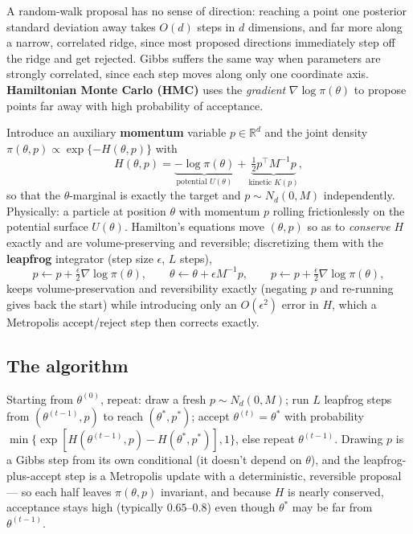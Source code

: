\documentclass[
  letterpaper,
  DIV=11,
  numbers=noendperiod]{scrreprt}
\begin{document}
A random-walk proposal has no sense of direction: reaching a point one
posterior standard deviation away takes \(O(d)\) steps in \(d\)
dimensions, and far more along a narrow, correlated ridge, since most
proposed directions immediately step off the ridge and get rejected.
Gibbs suffers the same way when parameters are strongly correlated,
since each step moves along only one coordinate axis.
\textbf{Hamiltonian Monte Carlo (HMC)} uses the \emph{gradient}
\(\nabla \log \pi(\theta)\) to propose points far away with high
probability of acceptance.

Introduce an auxiliary \textbf{momentum} variable \(p \in \mathbb R^d\)
and the joint density \(\pi(\theta, p) \propto \exp\{-H(\theta,p)\}\)
with \[
H(\theta, p) = \underbrace{-\log \pi(\theta)}_{\text{potential } U(\theta)} + \underbrace{\tfrac12 p^\top M^{-1} p}_{\text{kinetic } K(p)},
\] so that the \(\theta\)-marginal is exactly the target and
\(p \sim N_d(0, M)\) independently. Physically: a particle at position
\(\theta\) with momentum \(p\) rolling frictionlessly on the potential
surface \(U(\theta)\). Hamilton's equations move \((\theta,p)\) so as to
\emph{conserve} \(H\) exactly and are volume-preserving and reversible;
discretizing them with the \textbf{leapfrog} integrator (step size
\(\epsilon\), \(L\) steps), \[
p \leftarrow p + \tfrac\epsilon2 \nabla\log\pi(\theta), \qquad \theta \leftarrow \theta + \epsilon M^{-1}p, \qquad p \leftarrow p + \tfrac\epsilon2\nabla\log\pi(\theta),
\] keeps volume-preservation and reversibility exactly (negating \(p\)
and re-running gives back the start) while introducing only an
\(O(\epsilon^2)\) error in \(H\), which a Metropolis accept/reject step
then corrects exactly.

\subsection{The algorithm}\label{the-algorithm-3}

Starting from \(\theta^{(0)}\), repeat: draw a fresh
\(p \sim N_d(0,M)\); run \(L\) leapfrog steps from
\((\theta^{(t-1)}, p)\) to reach \((\theta^*, p^*)\); accept
\(\theta^{(t)} = \theta^*\) with probability
\(\min\{\exp[H(\theta^{(t-1)},p) - H(\theta^*,p^*)], 1\}\), else repeat
\(\theta^{(t-1)}\). Drawing \(p\) is a Gibbs step from its own
conditional (it doesn't depend on \(\theta\)), and the
leapfrog-plus-accept step is a Metropolis update with a deterministic,
reversible proposal --- so each half leaves \(\pi(\theta,p)\) invariant,
and because \(H\) is nearly conserved, acceptance stays high (typically
\(0.65\)--\(0.8\)) even though \(\theta^*\) may be far from
\(\theta^{(t-1)}\).
\end{document}
